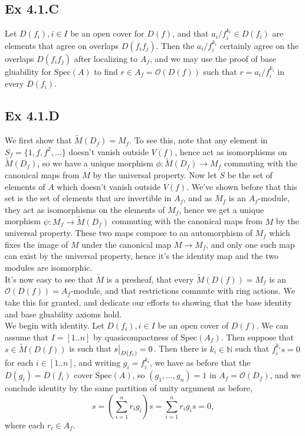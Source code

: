 \documentclass{article}
\newcommand\restr[2]{{%
  \left.\kern-\nulldelimiterspace %
  #1 %
  \vphantom{\big|} %
  \right|_{#2} %
  }}
\theoremstyle{definition}
\newcommand{\N}{\mathbb{N}}
\newcommand{\Spec}{\text{Spec}}
\begin{document}
\subsection*{Ex 4.1.C}

Let $D(f_i), i \in I$ be an open cover for $D(f)$, and that $a_i/f_i^{k_i} \in
	D(f_i)$ are elements that agree on overlaps $D(f_if_j)$. Then the
$a_i/f_i^{k_i}$ certainly agree on the overlaps $D(f_if_j)$ after localizing to
$A_f$, and we may use the proof of base gluability for $\Spec(A)$ to find $r
	\in A_f = \mathcal{O}(D(f))$ such that $r = a_i/f_i^{k_i}$ in every $D(f_i)$.

\subsection*{Ex 4.1.D}

We first show that $\widetilde{M}(D_f) = M_{f}$. To see this, note that any
element in $S_{f} = \{1, f, f^2, \ldots \}$ doesn't vanish outside $V(f)$,
hence act as isomorphisms on $\widetilde{M}(D_f)$, so we have a unique morphism
$\phi : \widetilde{M}(D_f) \to M_f$ commuting with the canonical maps from $M$
by the universal property. Now let $S$ be the set of elements of $A$ which
doesn't vanish outside $V(f)$. We've shown before that this set is the set of
elements that are invertible in $A_f$, and as $M_f$ is an $A_f$-module, they
act as isomorphisms on the elements of $M_f$, hence we get a unique morphism
$\psi : M_f \to \widetilde{M}(D_f)$ commuting with the canonical maps from $M$
by the universal property. These two maps compose to an automorphism of $M_f$
which fixes the image of $M$ under the canonical map $M \to M_f$, and only one
such map can exist by the universal property, hence it's the identity map and
the two modules are isomorphic. \\

It's now easy to see that $\widetilde{M}$ is a presheaf, that every
$\widetilde{M}(D(f)) = M_f$ is an $\mathcal{O}(D(f)) = A_f$-module, and that
restrictions commute with ring actions. We take this for granted, and dedicate
our efforts to showing that the base identity and base gluability axioms hold.
\\

We begin with identity. Let $D(f_i), i \in I$ be an open cover of $D(f)$. We
can assume that $I = [1..n]$ by quasicompactness of $\Spec(A_f)$. Then suppose
that $s \in \widetilde{M}(D(f))$ is such that $\restr{s}{D(f_i)} = 0$. Then
there is $k_i \in \N$ such that $f_i^{k_i} s = 0$ for each $i \in [1..n]$, and
writing $g_i = f_i^{k_i}$, we have as before that the $D(g_i) = D(f_i)$ cover
$\Spec(A)$, so $(g_1, \ldots, g_n) = 1$ in $A_f = \mathcal{O}(D_f)$, and we
conclude identity by the same partition of unity argument as before,
\[
	s
	=
	\left(\sum_{i = 1}^{n} r_i g_i\right)s
	=
	\sum_{i = 1}^{n} r_i g_i s
	=
	0,
\]
where each $r_i \in A_f$. \\
\end{document}
